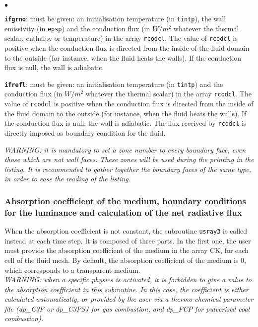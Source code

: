 {{{\begin{list}{$\bullet$}{}
\item \texttt{\textbf{ifgrno}}: must be given: an initialisation temperature (in
      \texttt{tintp}), the wall emissivity (in \texttt{epsp}) and the conduction
      flux (in $W/m^2$ whatever the thermal scalar, enthalpy or temperature) in
      the array \texttt{rcodcl}. The value of \texttt{rcodcl} is positive when the
      conduction flux is directed from the inside of the fluid domain to the
      outside (for instance, when the fluid heats the walls). If the
      conduction flux is null, the wall is adiabatic.

\item \texttt{\textbf{ifrefl}}: must be given: an initialisation temperature (in
      \texttt{tintp}) and the conduction flux (in $W/m^2$ whatever the thermal
      scalar) in the array \texttt{rcodcl}. The value of \texttt{rcodcl} is
      positive when the conduction flux is directed from the inside of the
      fluid domain to the outside (for instance, when the fluid heats the
      walls). If the conduction flux is null, the wall is adiabatic. The flux
      received by \texttt{rcodcl} is directly imposed as boundary condition for
      the fluid.

\end{list}

\noindent
{\em WARNING: it is mandatory to set a zone number to every boundary
face, even those which are not wall faces. These zones will be used during the
printing in the listing. It is recommended to gather together the
boundary faces of the same type, in order to ease the reading of the
listing.}\\

\subsubsection{Absorption coefficient of the medium, boundary conditions
   for the luminance and calculation of the net radiative flux}
When the absorption coefficient is not constant, the subroutine \texttt{usray3} is called instead at each time step. It is composed of three parts. In the first one, the user
must provide the absorption coefficient of the medium in the array CK,
for each cell of the fluid mesh. By default, the absorption coefficient
of the medium is 0, which corresponds to a transparent medium.\\

{\em WARNING: when a specific physics is activated, it is forbidden to
give a value to the absorption coefficient in this subroutine. In this
case, the coefficient is either calculated automatically, or provided by the user {\em via} a
thermo-chemical parameter file (dp\_C3P or dp\_C3PSJ for gas combustion,
and dp\_FCP for pulverised coal combustion).}\\

}}}
